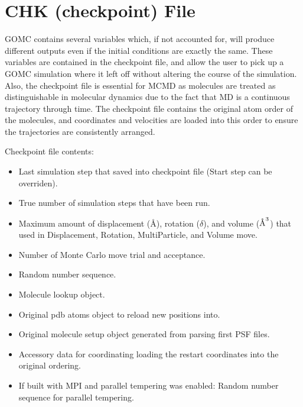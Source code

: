 \documentclass[letterpaper,10pt,english]{sphinxmanual}
\begin{document}
\section{CHK (checkpoint) File}
\label{\detokenize{input_file:chk-checkpoint-file}}
\sphinxAtStartPar
GOMC contains several variables which, if not accounted for, will produce different outputs even if the initial conditions are exactly the same.  These variables are contained in the checkpoint file, and allow the user to pick up a GOMC simulation where it left off without altering the course of the simulation.  Also, the checkpoint file is essential for MCMD as molecules are treated as distinguishable in molecular dynamics due to the fact that MD is a continuous trajectory through time.  The checkpoint file contains the original atom order of the molecules, and coordinates and velocities are loaded into this order to ensure the trajectories are consistently arranged.

\sphinxAtStartPar
Checkpoint file contents:
\begin{itemize}
\item {} 
\sphinxAtStartPar
Last simulation step that saved into checkpoint file (Start step can be overriden).

\item {} 
\sphinxAtStartPar
True number of simulation steps that have been run.

\item {} 
\sphinxAtStartPar
Maximum amount of displacement (Å), rotation (\(\delta\)), and volume (\(\AA^3\)) that used in Displacement, Rotation, MultiParticle, and Volume move.

\item {} 
\sphinxAtStartPar
Number of Monte Carlo move trial and acceptance.

\item {} 
\sphinxAtStartPar
Random number sequence.

\item {} 
\sphinxAtStartPar
Molecule lookup object.

\item {} 
\sphinxAtStartPar
Original pdb atoms object to reload new positions into.

\item {} 
\sphinxAtStartPar
Original molecule setup object generated from parsing first PSF files.

\item {} 
\sphinxAtStartPar
Accessory data for coordinating loading the restart coordinates into the original ordering.

\item {} 
\sphinxAtStartPar
If built with MPI and parallel tempering was enabled: Random number sequence for parallel tempering.

\end{itemize}
\end{document}
